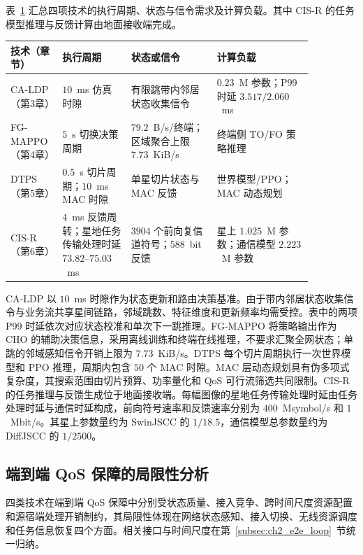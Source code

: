 表~\ref{tab:proposed_tech_deployment} 汇总四项技术的执行周期、状态与信令需求及计算负载。其中 CIS-R 的任务模型推理与反馈计算由地面接收端完成。

\begin{table}[!htp]
\centering
{}
\label{tab:proposed_tech_deployment}
\small
\renewcommand{\arraystretch}{1.20}
\begin{tabular}{p{0.12\linewidth} p{0.20\linewidth} p{0.25\linewidth} p{0.29\linewidth}}
\toprule
技术（章节） & 执行周期 & 状态或信令 & 计算负载 \\
\midrule
CA-LDP（第3章）
& $10$~ms 仿真时隙
& 有限跳带内邻居状态收集信令
& $0.23$~M 参数；P99 时延 $3.517/2.060$~ms \\
FG-MAPPO（第4章）
& $5$~s 切换决策周期
& $79.2$~B/s/终端；区域聚合上限 $7.73$~KiB/s
& 终端侧 TO/FO 策略推理 \\
DTPS（第5章）
& $0.5$~s 切片周期；$10$~ms MAC 时隙
& 单星切片状态与 MAC 反馈
& 世界模型/PPO；MAC 动态规划 \\
CIS-R（第6章）
& $4$~ms 反馈周转；星地任务传输处理时延 $73.82$--$75.03$~ms
& $3904$ 个前向复信道符号；$588$~bit 反馈
& 星上 $1.025$~M 参数；通信模型 $2.223$~M 参数 \\
\bottomrule
\end{tabular}
\end{table}

CA-LDP 以 $10$~ms 时隙作为状态更新和路由决策基准。由于带内邻居状态收集信令与业务流共享星间链路，邻域跳数、特征维度和更新频率均需受控。表中的两项 P99 时延依次对应状态校准和单次下一跳推理。FG-MAPPO 将策略输出作为 CHO 的辅助决策信息，采用离线训练和终端在线推理，不要求汇聚全网状态；单跳的邻域感知信令开销上限为 $7.73$~KiB/s。DTPS 每个切片周期执行一次世界模型和 PPO 推理，周期内包含 $50$ 个 MAC 时隙。MAC 层动态规划具有伪多项式复杂度，其搜索范围由切片预算、功率量化和 QoS 可行流筛选共同限制。CIS-R 的任务推理与反馈生成位于地面接收端。每幅图像的星地任务传输处理时延由任务处理时延与通信时延构成，前向符号速率和反馈速率分别为 $400$~Msymbol/s 和 $1$~Mbit/s。其星上参数量约为 SwinJSCC 的 $1/18.5$，通信模型总参数量约为 DiffJSCC 的 $1/2500$。

\subsection{端到端 QoS 保障的局限性分析}
\label{subsec:ch2_challenge}

四类技术在端到端 QoS 保障中分别受状态质量、接入竞争、跨时间尺度资源配置和源宿端处理开销制约，其局限性体现在网络状态感知、接入切换、无线资源调度和任务信息恢复四个方面。相关接口与时间尺度在第~\ref{subsec:ch2_e2e_loop}~节统一归纳。

